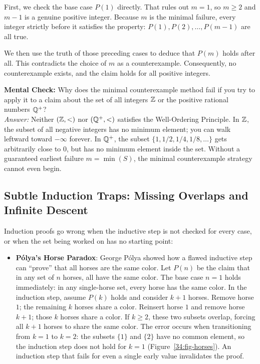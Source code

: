 First, we check the base case $P(1)$ directly. That rules out $m = 1$, so $m \ge 2$ and $m - 1$ is a genuine positive integer. Because $m$ is the minimal failure, every integer strictly before it satisfies the property: $P(1), P(2), \dots, P(m-1)$ are all true.

We then use the truth of those preceding cases to deduce that $P(m)$ holds after all. This contradicts the choice of $m$ as a counterexample. Consequently, no counterexample exists, and the claim holds for all positive integers.

\begin{walkbox}
\textbf{Mental Check:} Why does the minimal counterexample method fail if you try to apply it to a claim about the set of all integers $\mathbb{Z}$ or the positive rational numbers $\mathbb{Q}^+$?
\\[0.3em]
\emph{Answer:} Neither $(\mathbb{Z}, <)$ nor $(\mathbb{Q}^+, <)$ satisfies the Well-Ordering Principle. In $\mathbb{Z}$, the subset of all negative integers has no minimum element; you can walk leftward toward $-\infty$ forever. In $\mathbb{Q}^+$, the subset $\{1, 1/2, 1/4, 1/8, \dots\}$ gets arbitrarily close to $0$, but has no minimum element inside the set. Without a guaranteed earliest failure $m = \min(S)$, the minimal counterexample strategy cannot even begin.
\end{walkbox}

\subsection{Subtle Induction Traps: Missing Overlaps and Infinite Descent}

Induction proofs go wrong when the inductive step is not checked for every case, or when the set being worked on has no starting point:

\begin{itemize}
  \item \textbf{P\'olya's Horse Paradox}: George P\'olya showed how a flawed inductive step can ``prove'' that all horses are the same color. Let $P(n)$ be the claim that in any set of $n$ horses, all have the same color. The base case $n=1$ holds immediately: in any single-horse set, every horse has the same color. In the induction step, assume $P(k)$ holds and consider $k+1$ horses. Remove horse $1$; the remaining $k$ horses share a color. Reinsert horse $1$ and remove horse $k+1$; those $k$ horses share a color. If $k \ge 2$, these two subsets overlap, forcing all $k+1$ horses to share the same color. The error occurs when transitioning from $k=1$ to $k=2$: the subsets $\{1\}$ and $\{2\}$ have no common element, so the induction step does not hold for $k=1$ (Figure~\ref{34:fig-horses}). An induction step that fails for even a single early value invalidates the proof.
\end{itemize}

